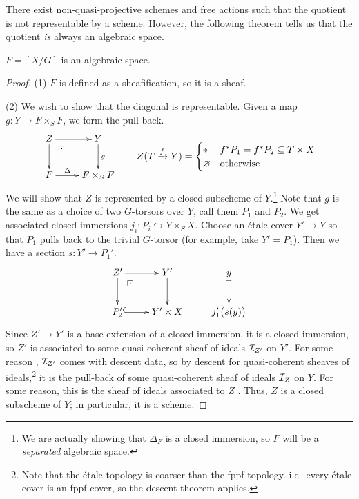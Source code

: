  \medskip
 \begin{remark}
   There exist non-quasi-projective schemes and free actions such that the quotient is
   not representable by a scheme. However, the following theorem tells us that the
   quotient \emph{is} always an algebraic space.
 \end{remark}
 \begin{lemma}
   $F=[X/G]$ is an algebraic space. 
 \end{lemma}
 \begin{proof}
   (1) $F$ is defined as a sheafification, so it is a sheaf.

   (2) We wish to show that the diagonal is representable. Given a map $g:Y\to F\times_S
   F$, we form the pull-back.
   \[\raisebox{1.5pc}{$\xymatrix{
    Z \ar[d]\ar[r] \ar@{}[dr]|(.25)\pb & Y\ar[d]^g\\
    F\ar[r]^<>(.5)\Delta & F\times_S F
   }$}\qquad
   Z(T\xrightarrow f Y) = \begin{cases}
     \ast & f^*P_1=f^*P_2\subseteq T\times X\\
     \varnothing & \text{otherwise}
   \end{cases}
   \]
    We will show that $Z$ is represented by a closed subscheme of $Y$.\footnote{ We are
   actually showing that $\Delta_F$ is a closed immersion, so $F$ will be a
   \emph{separated} algebraic space.} Note that $g$ is the same as a choice of two
   $G$-torsors over $Y$, call them $P_1$ and $P_2$. We get associated closed immersions
   $j_i:P_i\hookrightarrow Y\times_S X$. Choose an \'etale cover $Y'\to Y$ so that $P_1$
   pulls back to the trivial $G$-torsor (for example, take $Y'=P_1$). Then we have a
   section $s:Y'\to P_1'$.
   \[\xymatrix{
    Z'\ar[r]\ar[d]\ar@{}[dr]|(.25)\pb & Y'\ar[d] & y\ar@{|->}[d]\\
    P_2'\ar@{^(->}[r]& Y'\times X & j_1'\bigl(s(y)\bigr)
   }\]
    Since $Z'\to Y'$ is a base extension of a closed immersion, it is a closed immersion,
   so $Z'$ is associated to some quasi-coherent sheaf of ideals $\mathcal{I}_{Z'}$ on $Y'$. For
   some reason \anton{}, $\mathcal{I}_{Z'}$ comes with descent data, so by descent for
   quasi-coherent sheaves of ideals,\footnote{Note that the \'etale topology is coarser
   than the fppf topology. i.e.~every \'etale cover is an fppf cover, so the descent
   theorem applies.} it is the pull-back of some quasi-coherent sheaf of ideals $\mathcal{I}_Z$ on
   $Y$. For some reason, this is the sheaf of ideals associated to $Z$ . Thus, $Z$ is a closed subscheme of $Y$; in
   particular, it is a scheme.


\end{proof}
